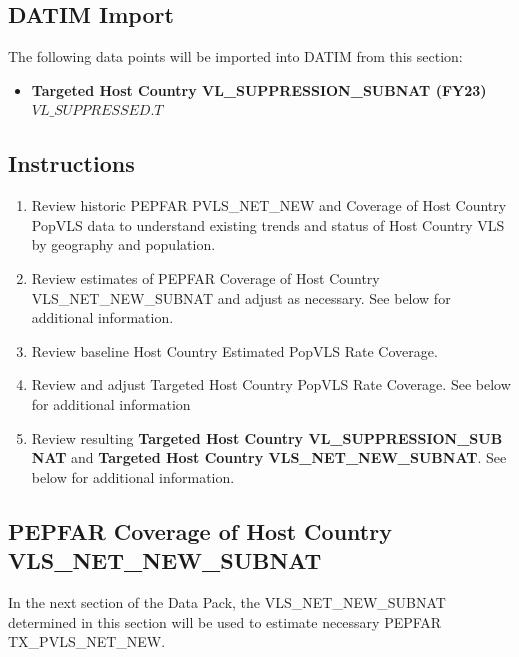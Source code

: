 \documentclass[
  openany]{book}
\providecommand{\tightlist}{%
  \setlength{\itemsep}{0pt}\setlength{\parskip}{0pt}}
\begin{document}
\hypertarget{datim-import-2}{%
\subsection{DATIM Import}\label{datim-import-2}}

The following data points will be imported into DATIM from this section:

\begin{itemize}
\tightlist
\item
  \textbf{Targeted Host Country VL\_SUPPRESSION\_SUBNAT (FY23)}
  \(VL\_SUPPRESSED.T\)
\end{itemize}

\hypertarget{instructions-2}{%
\subsection{Instructions}\label{instructions-2}}

\begin{enumerate}
\def\labelenumi{\arabic{enumi}.}
\item
  Review historic PEPFAR PVLS\_NET\_NEW and Coverage of Host Country
  PopVLS data to understand existing trends and status of Host Country
  VLS by geography and population.
\item
  Review estimates of PEPFAR Coverage of Host Country
  VLS\_NET\_NEW\_SUBNAT and adjust as necessary. See below for additional
  information.
\item
  Review baseline Host Country Estimated PopVLS Rate Coverage.
\item
  Review and adjust Targeted Host Country PopVLS Rate Coverage. See
  below for additional information
\item
  Review resulting \textbf{Targeted Host Country VL\_SUPPRESSION\_SUB NAT}
  and \textbf{Targeted Host Country VLS\_NET\_NEW\_SUBNAT}. See below for
  additional information.
\end{enumerate}

\hypertarget{pepfar-coverage-of-host-country-vls_net_new_subnat}{%
\subsection{PEPFAR Coverage of Host Country VLS\_NET\_NEW\_SUBNAT}\label{pepfar-coverage-of-host-country-vls_net_new_subnat}}

In the next section of the Data Pack, the VLS\_NET\_NEW\_SUBNAT determined
in this section will be used to estimate necessary PEPFAR
TX\_PVLS\_NET\_NEW.
\end{document}
